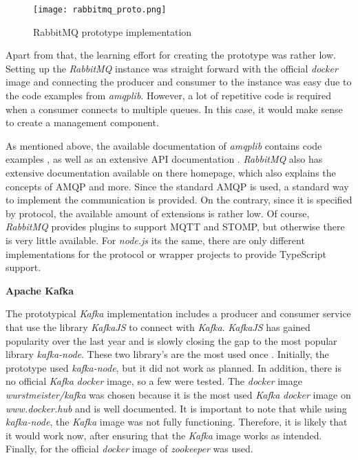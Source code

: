 \begin{figure}
	\centering
	\texttt{[image: rabbitmq\_proto.png]}
	\caption{RabbitMQ prototype implementation}
	\label{img:rabbitmqproto}
\end{figure}

Apart from that, the learning effort for creating the prototype was rather low.
Setting up the \textit{RabbitMQ} instance was straight forward with the official \textit{docker} image and connecting the producer and consumer to the instance was easy due to the code examples from \textit{amqplib}.
However, a lot of repetitive code is required when a consumer connects to multiple queues.
In this case, it would make sense to create a management component.

As mentioned above, the available documentation of \textit{amqplib} contains code examples \cite{MichaelBridgen.25.04.2018}, as well as an extensive \ac{API} documentation \cite{MichaelBridgen.14.05.2020}.
\textit{RabbitMQ} also has extensive documentation available on there homepage, which also explains the concepts of \ac{AMQP} and more.
Since the standard \ac{AMQP} is used, a standard way to implement the communication is provided.
On the contrary, since it is specified by protocol, the available amount of extensions is rather low.
Of course, \textit{RabbitMQ} provides plugins to support \ac{MQTT} and \ac{STOMP}, but otherwise there is very little available.
For \textit{node.js} its the same, there are only different implementations for the protocol or wrapper projects to provide TypeScript support.

\textbf{Apache Kafka}

The prototypical \textit{Kafka} implementation includes a producer and consumer service that use the library \textit{KafkaJS} to connect with \textit{Kafka}.
\textit{KafkaJS} has gained popularity over the last year and is slowly closing the gap to the most popular library \textit{kafka-node}.
These two library's are the most used once \cite{npmtrends.2020b}.
Initially, the prototype used \textit{kafka-node}, but it did not work as planned.
In addition, there is no official \textit{Kafka} \textit{docker} image,  so a few were tested.
The \textit{docker} image \textit{wurstmeister/kafka} was chosen because it is the most used \textit{Kafka} \textit{docker} image on \textit{www.docker.hub} \cite{DockerInc.05.06.2020} and is well documented.
It is important to note that while using \textit{kafka-node}, the \textit{Kafka} image was not fully functioning.
Therefore, it is likely that it would work now, after ensuring that the \textit{Kafka} image works as intended.
Finally, for the official \textit{docker} image of \textit{zookeeper} was used.

